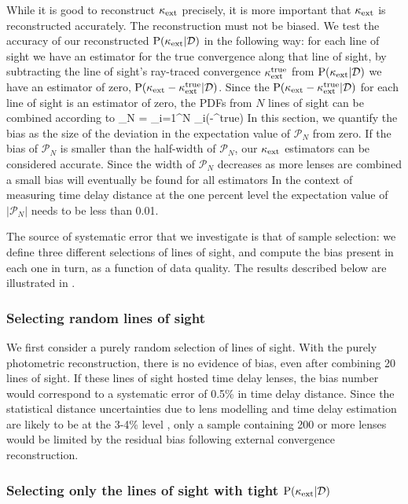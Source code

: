 \documentclass[useAMS,usenatbib]{mn2e}
\begin{document}
While it is good to reconstruct $\kappa_{\rm ext}$ precisely, it is more important that
$\kappa_{\rm ext}$ is reconstructed accurately. The reconstruction must not be biased. 
We test the accuracy of our reconstructed ${\rm P}(\kappa_{\rm ext}|{\mathcal{D}})$ in the following
way: for each line of sight we have an estimator for the true convergence along
that line of sight, by subtracting the line of sight's ray-traced convergence
$\kappa_{\rm ext}^{\rm true}$ from ${\rm P}(\kappa_{\rm ext}|{\mathcal{D}})$ we have an estimator of zero, ${\rm P}(\kappa_{\rm ext}-\kappa_{\rm ext}^{\rm true}|{\mathcal{D}})$.
 Since the ${\rm P}(\kappa_{\rm ext}-\kappa_{\rm ext}^{\rm true}|{\mathcal{D}})$ for
each line of sight is an \independant estimator of zero, the PDFs from $N$ lines of sight
can be combined according to
\be
\label{eq:bias}
_N = \prod_{i=1}^N \pr_i(\kappax-\kappax^{\rm true})
\ee
In this section, we quantify the bias as the size of the deviation in the
expectation value of $\mathcal{P}_N$ from zero. If the bias of $\mathcal{P}_N$
is smaller than the half-width of $\mathcal{P}_N$, our $\kappa_{\rm ext}$ estimators can
be considered accurate. Since the width of $\mathcal{P}_N$ decreases as more
lenses are combined a small bias will eventually be found for all estimators
In the context of measuring time delay distance at the one percent level the
expectation value of $|\mathcal{P}_N|$ needs to be less than 0.01.


The source of systematic error that we investigate is that of sample
selection: we define three different selections of lines of sight, and compute
the bias present in each one in turn, as a function of data quality. The
results described below are illustrated in .


\subsubsection{Selecting random lines of sight}
\label{sec:bias:random}

We first consider a purely random selection of lines of sight. With the purely
photometric reconstruction, there is no evidence of bias, even after combining 20
lines of sight. If these lines of sight hosted time
delay lenses, the bias number would correspond to a systematic error of
0.5\% in time delay distance. Since the statistical distance uncertainties due
to lens modelling and time delay estimation are likely to be at the 3-4\%
level \citep{SuyuEtal2010},  only a sample containing 200 or more lenses would
be limited by the residual bias  following external convergence
reconstruction.


\subsubsection{Selecting only the lines of sight with tight ${\rm P}(\kappa_{\rm ext}|{\mathcal{D}})$}
\label{sec:bias:tightPDF}
\end{document}
